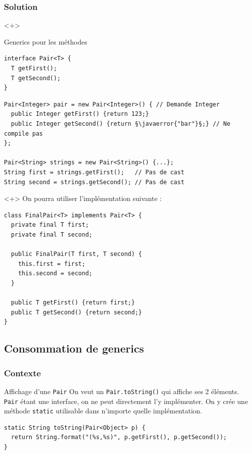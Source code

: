 \documentclass[draft]{beamer}
\makeatletter
\def\uwave{\bgroup\markoverwith{\lower4\p@\hbox{\sixly \textcolor{errorcolor}{\char58}}}\ULon}
\newcommand{\javaerror}[1]{%
  \uwave{#1}%
}
\makeatother
\begin{document}
\begin{frame}[fragile]
\frametitle{Solution}
\begin{onlyenv}<+>
\begin{exampleblock}{Generics pour les méthodes}
\begin{lstlisting}[numbers=none]
interface Pair<T> {
  T getFirst();
  T getSecond();
}
\end{lstlisting}
\end{exampleblock}
\begin{lstlisting}
Pair<Integer> pair = new Pair<Integer>() { // Demande Integer
  public Integer getFirst() {return 123;}
  public Integer getSecond() {return §\javaerror{"bar"}§;} // Ne compile pas
};

Pair<String> strings = new Pair<String>() {...};
String first = strings.getFirst();   // Pas de cast
String second = strings.getSecond(); // Pas de cast
\end{lstlisting}
\end{onlyenv}
\begin{onlyenv}<+>
On pourra utiliser l'implémentation suivante :
\begin{lstlisting}
class FinalPair<T> implements Pair<T> {
  private final T first;
  private final T second;

  public FinalPair(T first, T second) {
    this.first = first;
    this.second = second;
  }

  public T getFirst() {return first;}
  public T getSecond() {return second;}
}
\end{lstlisting}
\end{onlyenv}
\end{frame}

\subsection{Consommation de generics}

\begin{frame}[fragile]
\frametitle{Contexte}
\begin{block}{Affichage d'une \lstinline{Pair}}
 On veut un \lstinline{Pair.toString()} qui affiche ses 2 éléments.
 \lstinline{Pair} étant une interface, on ne peut directement l'y implémenter.
 On y crée une méthode \lstinline{static} utilisable dans n'importe quelle implémentation.
\end{block}
\begin{lstlisting}
static String toString(Pair<Object> p) {
  return String.format("(%s,%s)", p.getFirst(), p.getSecond());
}
\end{lstlisting}
\end{frame}
\end{document}
